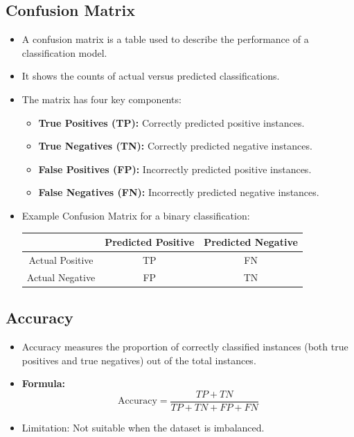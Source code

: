 \documentclass[8pt]{article}
\begin{document}
\subsection*{Confusion Matrix}
\begin{itemize}
    \item A confusion matrix is a table used to describe the performance of a classification model.
    \item It shows the counts of actual versus predicted classifications.
    \item The matrix has four key components:
    \begin{itemize}
        \item \textbf{True Positives (TP):} Correctly predicted positive instances.
        \item \textbf{True Negatives (TN):} Correctly predicted negative instances.
        \item \textbf{False Positives (FP):} Incorrectly predicted positive instances.
        \item \textbf{False Negatives (FN):} Incorrectly predicted negative instances.
    \end{itemize}
    \item Example Confusion Matrix for a binary classification:
    \begin{center}
        \begin{tabular}{|c|c|c|}
            \hline
            & Predicted Positive & Predicted Negative \\
            \hline
            Actual Positive & TP & FN \\
            \hline
            Actual Negative & FP & TN \\
            \hline
        \end{tabular}
    \end{center}
\end{itemize}

\subsection*{Accuracy}
\begin{itemize}
    \item Accuracy measures the proportion of correctly classified instances (both true positives and true negatives) out of the total instances.
    \item \textbf{Formula:}
    \[
    \text{Accuracy} = \frac{TP + TN}{TP + TN + FP + FN}
    \]
    \item Limitation: Not suitable when the dataset is imbalanced.
\end{itemize}
\end{document}
